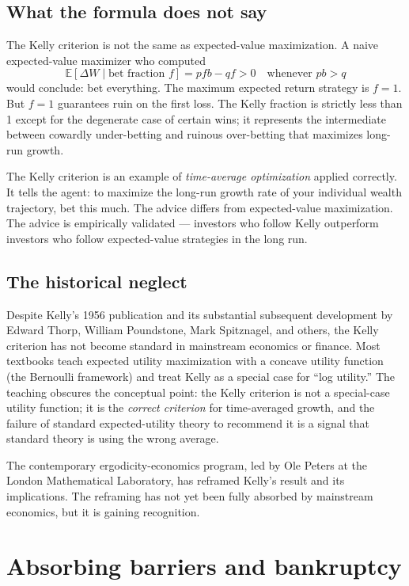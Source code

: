 \subsection{What the formula does not say}

The Kelly criterion is not the same as expected-value maximization.
A naive expected-value maximizer who computed
\[
    \mathbb{E}[\Delta W \mid \text{bet fraction } f]
    = pf b - qf > 0 \quad \text{whenever } pb > q
\]
would conclude: bet everything. The maximum expected return
strategy is $f = 1$. But $f = 1$ guarantees ruin on the first loss.
The Kelly fraction is strictly less than 1 except for the
degenerate case of certain wins; it represents the intermediate
between cowardly under-betting and ruinous over-betting that
maximizes long-run growth.

The Kelly criterion is an example of \emph{time-average optimization}
applied correctly. It tells the agent: to maximize the long-run
growth rate of your individual wealth trajectory, bet this much.
The advice differs from expected-value maximization. The advice is
empirically validated --- investors who follow Kelly outperform
investors who follow expected-value strategies in the long run.

\subsection{The historical neglect}

Despite Kelly's 1956 publication and its substantial subsequent
development by Edward Thorp, William Poundstone, Mark Spitznagel, and
others, the Kelly criterion has not become standard in mainstream
economics or finance. Most textbooks teach expected utility
maximization with a concave utility function (the Bernoulli
framework) and treat Kelly as a special case for ``log utility.''
The teaching obscures the conceptual point: the Kelly criterion is
not a special-case utility function; it is the \emph{correct
criterion} for time-averaged growth, and the failure of standard
expected-utility theory to recommend it is a signal that standard
theory is using the wrong average.

The contemporary ergodicity-economics program, led by Ole Peters at
the London Mathematical Laboratory, has reframed Kelly's result and
its implications. The reframing has not yet been fully absorbed by
mainstream economics, but it is gaining recognition.

\section{Absorbing barriers and bankruptcy}
\label{sec:absorbing-barriers}


